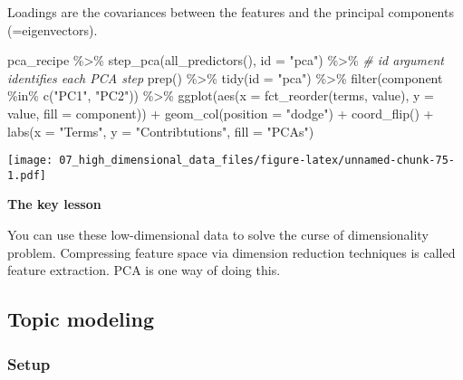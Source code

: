 \documentclass[
]{book}
\newenvironment{Shaded}{\begin{snugshade}}{\end{snugshade}}
\newcommand{\AttributeTok}[1]{\textcolor[rgb]{0.77,0.63,0.00}{#1}}
\newcommand{\CommentTok}[1]{\textcolor[rgb]{0.56,0.35,0.01}{\textit{#1}}}
\newcommand{\FunctionTok}[1]{\textcolor[rgb]{0.00,0.00,0.00}{#1}}
\newcommand{\NormalTok}[1]{#1}
\newcommand{\SpecialCharTok}[1]{\textcolor[rgb]{0.00,0.00,0.00}{#1}}
\newcommand{\StringTok}[1]{\textcolor[rgb]{0.31,0.60,0.02}{#1}}
\begin{document}
Loadings are the covariances between the features and the principal components (=eigenvectors).

\begin{Shaded}
\begin{Highlighting}[]
\NormalTok{pca\_recipe }\SpecialCharTok{\%\textgreater{}\%}
  \FunctionTok{step\_pca}\NormalTok{(}\FunctionTok{all\_predictors}\NormalTok{(), }
           \AttributeTok{id =} \StringTok{"pca"}\NormalTok{) }\SpecialCharTok{\%\textgreater{}\%} \CommentTok{\# id argument identifies each PCA step }
  \FunctionTok{prep}\NormalTok{() }\SpecialCharTok{\%\textgreater{}\%}
  \FunctionTok{tidy}\NormalTok{(}\AttributeTok{id =} \StringTok{"pca"}\NormalTok{) }\SpecialCharTok{\%\textgreater{}\%}
  \FunctionTok{filter}\NormalTok{(component }\SpecialCharTok{\%in\%} \FunctionTok{c}\NormalTok{(}\StringTok{"PC1"}\NormalTok{, }\StringTok{"PC2"}\NormalTok{)) }\SpecialCharTok{\%\textgreater{}\%}
  \FunctionTok{ggplot}\NormalTok{(}\FunctionTok{aes}\NormalTok{(}\AttributeTok{x =} \FunctionTok{fct\_reorder}\NormalTok{(terms, value), }\AttributeTok{y =}\NormalTok{ value, }
             \AttributeTok{fill =}\NormalTok{ component)) }\SpecialCharTok{+}
    \FunctionTok{geom\_col}\NormalTok{(}\AttributeTok{position =} \StringTok{"dodge"}\NormalTok{) }\SpecialCharTok{+}
    \FunctionTok{coord\_flip}\NormalTok{() }\SpecialCharTok{+}
    \FunctionTok{labs}\NormalTok{(}\AttributeTok{x =} \StringTok{"Terms"}\NormalTok{,}
         \AttributeTok{y =} \StringTok{"Contribtutions"}\NormalTok{,}
         \AttributeTok{fill =} \StringTok{"PCAs"}\NormalTok{) }
\end{Highlighting}
\end{Shaded}

\texttt{[image: 07\_high\_dimensional\_data\_files/figure-latex/unnamed-chunk-75-1.pdf]}

\textbf{The key lesson}

You can use these low-dimensional data to solve the curse of dimensionality problem. Compressing feature space via dimension reduction techniques is called feature extraction. PCA is one way of doing this.

\hypertarget{topic-modeling}{%
\subsection{Topic modeling}\label{topic-modeling}}

\hypertarget{setup-6}{%
\subsubsection{Setup}\label{setup-6}}
\end{document}
